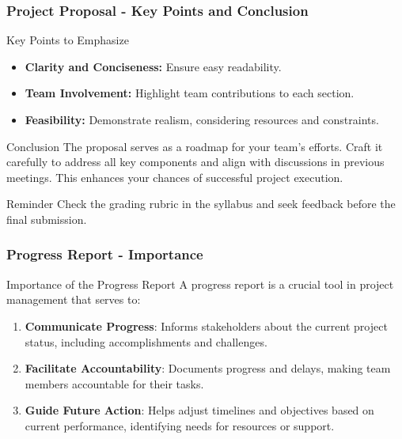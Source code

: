 \documentclass[aspectratio=169]{beamer}
\begin{document}
\begin{frame}[fragile]
  \frametitle{Project Proposal - Key Points and Conclusion}
  \begin{block}{Key Points to Emphasize}
    \begin{itemize}
      \item \textbf{Clarity and Conciseness:} Ensure easy readability.
      \item \textbf{Team Involvement:} Highlight team contributions to each section.
      \item \textbf{Feasibility:} Demonstrate realism, considering resources and constraints.
    \end{itemize}
  \end{block}

  \begin{block}{Conclusion}
    The proposal serves as a roadmap for your team's efforts. Craft it carefully to address all key components and align with discussions in previous meetings. This enhances your chances of successful project execution.
  \end{block}

  \begin{block}{Reminder}
    Check the grading rubric in the syllabus and seek feedback before the final submission.
  \end{block}
\end{frame}

\begin{frame}[fragile]
  \frametitle{Progress Report - Importance}
  \begin{block}{Importance of the Progress Report}
    A progress report is a crucial tool in project management that serves to:
  \end{block}
  \begin{enumerate}
    \item \textbf{Communicate Progress}: Informs stakeholders about the current project status, including accomplishments and challenges.
    \item \textbf{Facilitate Accountability}: Documents progress and delays, making team members accountable for their tasks.
    \item \textbf{Guide Future Action}: Helps adjust timelines and objectives based on current performance, identifying needs for resources or support.
  \end{enumerate}
\end{frame}
\end{document}
